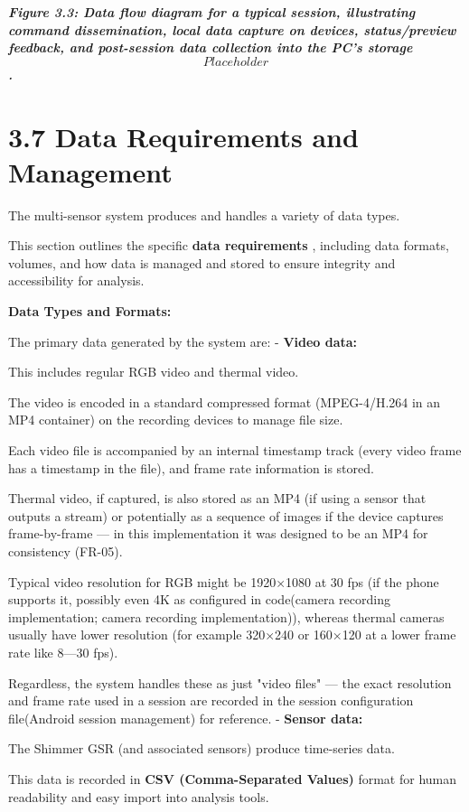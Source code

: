 \textit{\textbf{Figure 3.3: Data flow diagram for a typical session, illustrating command dissemination, local data capture on devices, status/preview feedback, and post-session data collection into the PC's storage \[Placeholder\].}
} \section{3.7 Data Requirements and Management}

The multi-sensor system produces and handles a variety of data types.

This section outlines the specific \textbf{data requirements}
, including data formats, volumes, and how data is managed and stored to ensure integrity and accessibility for analysis.

\textbf{Data Types and Formats:}

The primary data generated by the system are: - \textbf{Video data:}

This includes regular RGB video and thermal video.

The video is encoded in a standard compressed format (MPEG-4/H.264 in an MP4 container) on the recording devices to manage file size.

Each video file is accompanied by an internal timestamp track (every video frame has a timestamp in the file), and frame rate information is stored.

Thermal video, if captured, is also stored as an MP4 (if using a sensor that outputs a stream) or potentially as a sequence of images if the device captures frame-by-frame --- in this implementation it was designed to be an MP4 for consistency (FR-05).

Typical video resolution for RGB might be 1920×1080 at 30 fps (if the phone supports it, possibly even 4K as configured in code(camera recording implementation; camera recording implementation)), whereas thermal cameras usually have lower resolution (for example 320×240 or 160×120 at a lower frame rate like 8---30 fps).

Regardless, the system handles these as just "video files" --- the exact resolution and frame rate used in a session are recorded in the session configuration file(Android session management) for reference. - \textbf{Sensor data:}

The Shimmer GSR (and associated sensors) produce time-series data.

This data is recorded in \textbf{CSV (Comma-Separated Values)}
 format for human readability and easy import into analysis tools.

